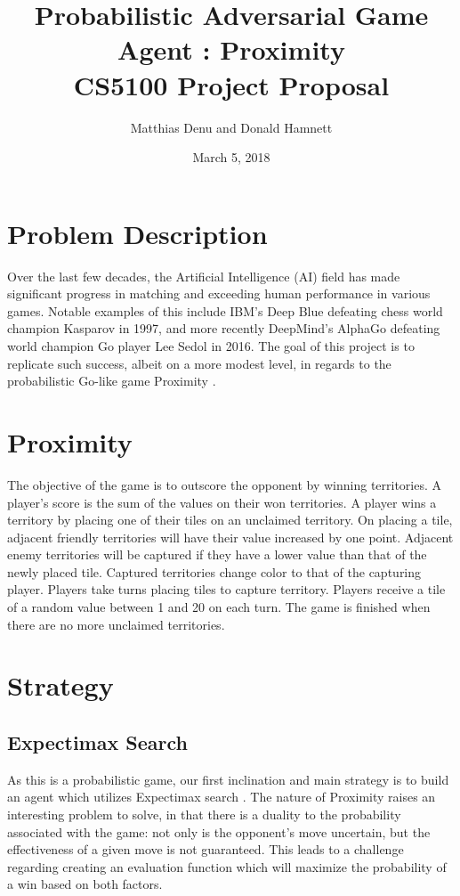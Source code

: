 \documentclass[10pt,letter]{article}
\begin{document}
\title{\Large Probabilistic Adversarial Game Agent : Proximity\\ \large CS5100 Project Proposal}
\author{Matthias Denu and Donald Hamnett}
\date{March 5, 2018}
\maketitle
\begin{multicols}{2}
\section*{Problem Description}
\par
Over the last few decades, the Artificial Intelligence (AI) field has made significant progress in matching and exceeding human performance in various games. Notable examples of this include IBM's Deep Blue \cite{deepblue} defeating chess world champion Kasparov in 1997, and more recently DeepMind's AlphaGo \cite{alphago} defeating world champion Go player Lee Sedol in 2016. The goal of this project is to replicate such success, albeit on a more modest level, in regards to the probabilistic Go-like game Proximity \cite{proximity}.
\section*{Proximity}
\par
The objective of the game is to outscore the opponent by winning territories. A player's score is the sum of the values on their won territories. A player wins a territory by placing one of their tiles on an unclaimed territory. On placing a tile, adjacent friendly territories will have their value increased by one point. Adjacent enemy territories will be captured if they have a lower value than that of the newly placed tile. Captured territories change color to that of the capturing player. Players take turns placing tiles to capture territory. Players receive a tile of a random value between 1 and 20 on each turn. The game is finished when there are no more unclaimed territories\cite{proximity, bacable_2015}.
\section*{Strategy}
\subsection*{Expectimax Search}
\par
As this is a probabilistic game, our first inclination and main strategy is to build an agent which utilizes Expectimax search \cite{aima}. The nature of Proximity raises an interesting problem to solve, in that there is a duality to the probability associated with the game: not only is the opponent's move uncertain, but the effectiveness of a given move is not guaranteed. This leads to a challenge regarding creating an evaluation function which will maximize the probability of a win based on both factors.

\end{multicols}
\end{document}

